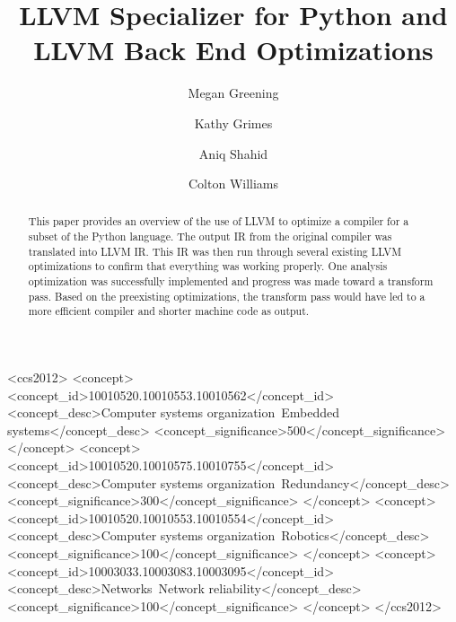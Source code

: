 \documentclass[sigconf]{acmart}
\begin{document}
\title{LLVM Specializer for Python and LLVM Back End Optimizations}
\subtitle{}


\author{Megan Greening}

\author{Kathy Grimes}

\author{Aniq Shahid}

\author{Colton Williams}

\renewcommand{\shortauthors}{M. Greening et al.}


\begin{abstract}
This paper provides an overview of the use of LLVM to optimize a compiler for a subset of the Python language. The output IR from the original compiler was translated into LLVM IR. This IR was then run through several existing LLVM optimizations to confirm that everything was working properly. One analysis optimization was successfully implemented and progress was made toward a transform pass. Based on the preexisting optimizations, the transform pass would have led to a more efficient compiler and shorter machine code as output.

\end{abstract}

%
%
\begin{CCSXML}
<ccs2012>
 <concept>
  <concept_id>10010520.10010553.10010562</concept_id>
  <concept_desc>Computer systems organization~Embedded systems</concept_desc>
  <concept_significance>500</concept_significance>
 </concept>
 <concept>
  <concept_id>10010520.10010575.10010755</concept_id>
  <concept_desc>Computer systems organization~Redundancy</concept_desc>
  <concept_significance>300</concept_significance>
 </concept>
 <concept>
  <concept_id>10010520.10010553.10010554</concept_id>
  <concept_desc>Computer systems organization~Robotics</concept_desc>
  <concept_significance>100</concept_significance>
 </concept>
 <concept>
  <concept_id>10003033.10003083.10003095</concept_id>
  <concept_desc>Networks~Network reliability</concept_desc>
  <concept_significance>100</concept_significance>
 </concept>
</ccs2012>  
\end{CCSXML}
\end{document}
